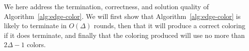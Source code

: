\label{sec:dimaed-correct}
We here address the termination, correctness, and solution quality of Algorithm~\ref{alg:edge-color}. We will first show that Algorithm~\ref{alg:edge-color} is likely to terminate in $O(\Delta)$ rounds, then that it will produce a correct coloring if it does terminate, and finally that the coloring produced will use no more than $2\Delta - 1$ colors.



